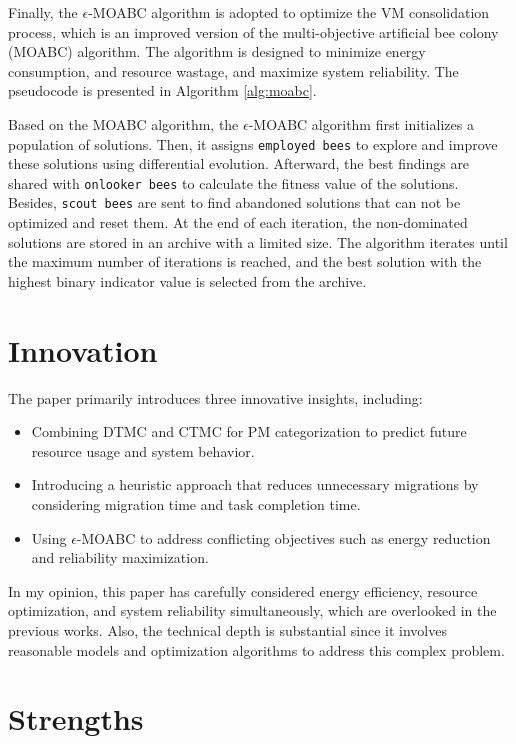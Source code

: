 \documentclass[UTF8, fontset=windows]{article}
\begin{document}
Finally, the $\epsilon$-MOABC algorithm is adopted to optimize the VM consolidation process, which is an improved version of the multi-objective artificial bee colony (MOABC) algorithm. The algorithm is designed to minimize energy consumption, and resource wastage, and maximize system reliability. The pseudocode is presented in Algorithm \ref{alg:moabc}.

Based on the MOABC algorithm, the $\epsilon$-MOABC algorithm first initializes a population of solutions. Then, it assigns \texttt{employed bees} to explore and improve these solutions using differential evolution. Afterward, the best findings are shared with \texttt{onlooker bees} to calculate the fitness value of the solutions. Besides, \texttt{scout bees} are sent to find abandoned solutions that can not be optimized and reset them. At the end of each iteration, the non-dominated solutions are stored in an archive with a limited size. The algorithm iterates until the maximum number of iterations is reached, and the best solution with
the highest binary indicator value is selected from the archive.

\section{Innovation}

The paper primarily introduces three innovative insights, including:

\begin{itemize}
  \item Combining DTMC and CTMC for PM categorization to predict future resource usage and system behavior.
  \item Introducing a heuristic approach that reduces unnecessary migrations by considering migration time and task completion time.
  \item Using $\epsilon$-MOABC to address conflicting objectives such as energy reduction and reliability maximization.
\end{itemize}

In my opinion, this paper has carefully considered energy efficiency, resource optimization, and system reliability simultaneously, which are overlooked in the previous works. Also, the technical depth is substantial since it involves reasonable models and optimization algorithms to address this complex problem.

\section{Strengths}
\end{document}
